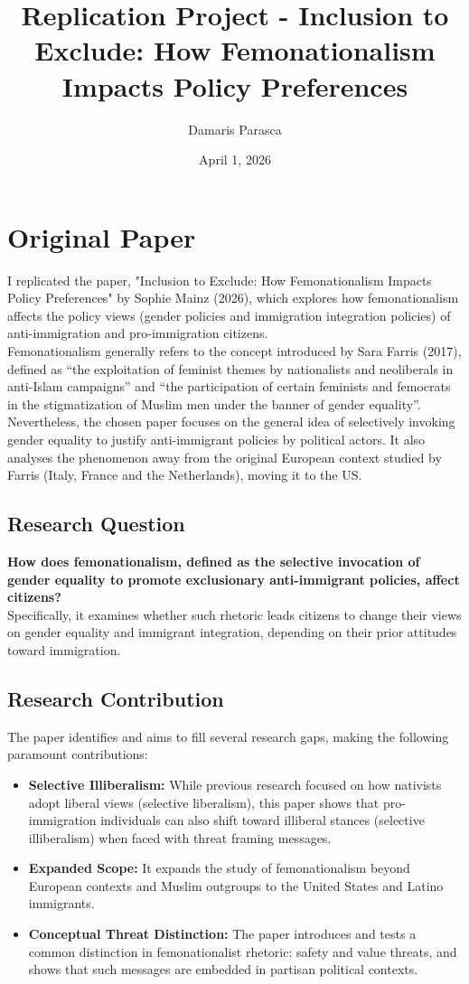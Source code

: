 \documentclass[12pt,letterpaper]{article}
\title{Replication Project - Inclusion to Exclude: How Femonationalism Impacts Policy Preferences}
\date{April 1, 2026}
\author{Damaris Parasca}
\begin{document}
	\maketitle
	\section*{Original Paper}
		I replicated the paper, "Inclusion to Exclude: How Femonationalism Impacts Policy Preferences" by Sophie Mainz (2026), which explores how femonationalism affects the policy views (gender policies and immigration integration policies) of anti-immigration and pro-immigration citizens. \\[.2cm]
		Femonationalism generally refers to the concept introduced by Sara Farris (2017), defined as “the exploitation of feminist themes by nationalists and neoliberals in anti-Islam campaigns” and “the participation of certain feminists and femocrats in the stigmatization of Muslim men under the banner of gender equality”. Nevertheless, the chosen paper focuses on the general idea of selectively invoking gender equality to justify anti-immigrant policies by political actors. It also analyses the phenomenon away from the original European context studied by Farris (Italy, France and the Netherlands), moving it to the US. 
		\subsection*{Research Question}
		\textbf{How does femonationalism, defined as the selective invocation of gender equality to promote exclusionary anti-immigrant policies, affect citizens?} \\[.2cm]
		Specifically, it examines whether such rhetoric leads citizens to change their views on gender equality and immigrant integration, depending on their prior attitudes toward immigration.
		\subsection*{Research Contribution}
		The paper identifies and aims to fill several research gaps, making the following paramount contributions: 
		\begin{itemize}
			\item \textbf{Selective Illiberalism:} While previous research focused on how nativists adopt liberal views (selective liberalism), this paper shows that pro-immigration individuals can also shift toward illiberal stances (selective illiberalism) when faced with threat framing messages.
			\item \textbf{Expanded Scope:} It expands the study of femonationalism beyond European contexts and Muslim outgroups to the United States and Latino immigrants.
			\item \textbf{Conceptual Threat Distinction:} The paper introduces and tests a common distinction in femonationalist rhetoric: safety and value threats, and shows that such messages are embedded in partisan political contexts. 
		\end{itemize}
\end{document}
